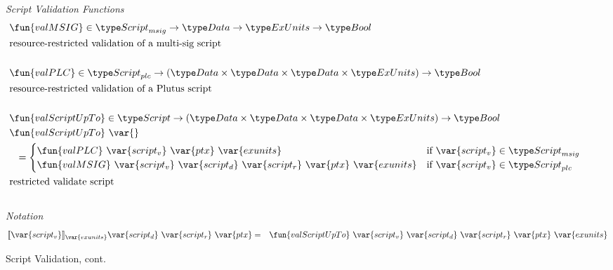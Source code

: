 %
\begin{figure*}[htb]
  \emph{Script Validation Functions}
  \begin{align*}
    & \fun{valMSIG} \in \ScriptMSig\to \Data \to \ExUnits \to\Bool \\
    & \text{resource-restricted validation of a multi-sig script} \\~\\
    & \fun{valPLC} \in \ScriptPlutus\to (\Data \times \Data \times \Data \times
    \ExUnits) \to \Bool \\
    & \text{resource-restricted validation of a Plutus script} \\~\\
    & \fun{valScriptUpTo} \in \Script\to (\Data \times \Data \times \Data \times \ExUnits)
    \to\Bool \\
    & \fun{valScriptUpTo}~\var{} \\
    &~~= \begin{cases}
              \fun{valPLC} ~\var{script_v} ~\var{ptx}~\var{exunits}
               & \text{if}~\var{script_v} \in \ScriptMSig \\
              \fun{valMSIG} ~\var{script_v} ~ \var{script_d}~\var{script_r}~\var{ptx}~\var{exunits} & \text{if}~
               \var{script_v} \in \ScriptPlutus
          \end{cases}
    \\ & \text{restricted validate script} \\~\\
  \end{align*}
  \emph{Notation}
  \begin{align*}
    \llbracket \var{script_v} \rrbracket_{\var{exunits}} \var{script_d}~\var{script_r}~\var{ptx}
    &=& \fun{valScriptUpTo} ~\var{script_v} ~ \var{script_d}~\var{script_r}~\var{ptx}~
    \var{exunits}
  \end{align*}
  \caption{Script Validation, cont.}
  \label{fig:defs:functions-valid}
\end{figure*}


\clearpage
